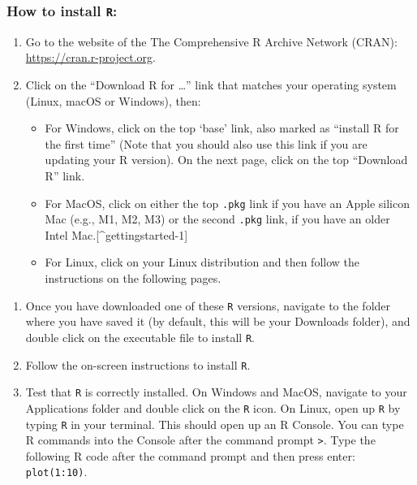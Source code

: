 \documentclass[
  letterpaper,
  DIV=11,
  numbers=noendperiod]{scrreprt}
\providecommand{\tightlist}{%
  \setlength{\itemsep}{0pt}\setlength{\parskip}{0pt}}\usepackage{longtable,booktabs,array}
\begin{document}
\subsubsection{\texorpdfstring{How to install
\texttt{R}:}{How to install R:}}\label{how-to-install-r}

\begin{enumerate}
\def\labelenumi{\arabic{enumi}.}
\item
  Go to the website of the The Comprehensive R Archive Network (CRAN):
  \url{https://cran.r-project.org}.
\item
  Click on the ``Download R for \ldots{}'' link that matches your
  operating system (Linux, macOS or Windows), then:

  \begin{itemize}
  \tightlist
  \item
    For Windows, click on the top `base' link, also marked as ``install
    R for the first time'' (Note that you should also use this link if
    you are updating your R version). On the next page, click on the top
    ``Download R'' link.
  \item
    For MacOS, click on either the top \texttt{.pkg} link if you have an
    Apple silicon Mac (e.g., M1, M2, M3) or the second \texttt{.pkg}
    link, if you have an older Intel Mac.{[}\^{}gettingstarted-1{]}
  \item
    For Linux, click on your Linux distribution and then follow the
    instructions on the following pages.
  \end{itemize}
\end{enumerate}

\begin{enumerate}
\def\labelenumi{\arabic{enumi}.}
\setcounter{enumi}{2}
\item
  Once you have downloaded one of these \texttt{R} versions, navigate to
  the folder where you have saved it (by default, this will be your
  Downloads folder), and double click on the executable file to install
  \texttt{R}.
\item
  Follow the on-screen instructions to install \texttt{R}.
\item
  Test that \texttt{R} is correctly installed. On Windows and MacOS,
  navigate to your Applications folder and double click on the
  \texttt{R} icon. On Linux, open up \texttt{R} by typing \texttt{R} in
  your terminal. This should open up an R Console. You can type R
  commands into the Console after the command prompt
  \texttt{\textgreater{}}. Type the following R code after the command
  prompt and then press enter: \texttt{plot(1:10)}.
\end{enumerate}
\end{document}
